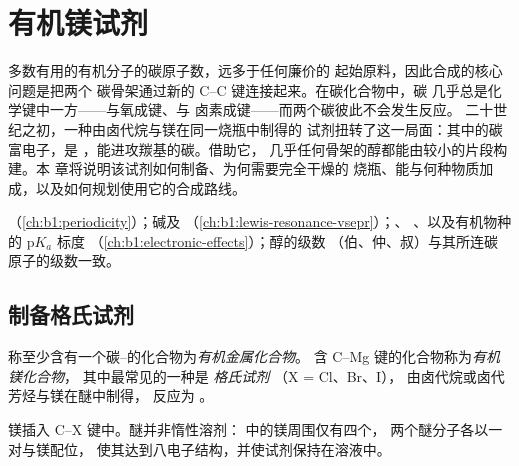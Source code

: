 \chapter{有机镁试剂}\label{ch:b1:organomagnesium}

多数有用的有机分子的碳原子数，远多于任何廉价的
起始原料，因此合成的核心问题是把两个
碳骨架通过新的 C--C 键连接起来。在碳化合物中，碳
几乎总是化学键中一方——与氧成键、与
卤素成键——而两个碳彼此不会发生反应。
二十世纪之初，一种由卤代烷与镁在同一烧瓶中制得的
试剂扭转了这一局面：其中的碳富电子，是
，能进攻羰基的碳。借助它，
几乎任何骨架的醇都能由较小的片段构建。本
章将说明该试剂如何制备、为何需要完全干燥的
烧瓶、能与何种物质加成，以及如何规划使用它的合成路线。

\begin{recall}
（\cref{ch:b1:periodicity}）；碱及
（\cref{ch:b1:lewis-resonance-vsepr}）；、
、以及有机物种的 $\mathrm{p}K_a$ 标度
（\cref{ch:b1:electronic-effects}）；醇的级数
（伯、仲、叔）与其所连碳原子的级数一致。
\end{recall}

\section{制备格氏试剂}

\begin{definition}\label{def:b1:organomagnesium:organometallic}
称至少含有一个碳–的化合物为\emph{有机金属化合物}。
含 C--Mg 键的化合物称为\emph{有机镁化合物}，
其中最常见的一种是
\emph{格氏试剂} （X = Cl、Br、I），
由卤代烷或卤代芳烃与镁在醚中制得，
反应为 。
\end{definition}

镁插入 C--X 键中。醚并非惰性溶剂：
 中的镁周围仅有四个，
两个醚分子各以一对与镁配位，
使其达到八电子结构，并使试剂保持在溶液中。

